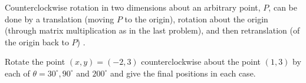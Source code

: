 {Counterclockwise rotation in two dimensions about an arbitrary point, $P$, can be done by a translation (moving $P$ to the origin), rotation about the origin (through matrix multiplication as in the last problem), and then retranslation (of the origin back to $P$) . 

Rotate the point $(x,y) = (-2,3)$ counterclockwise about the point $(1,3)$ by each of $\theta = 30^{\circ}, 90^\circ$ and $200^\circ$ and give the final positions in each case.}
{}
